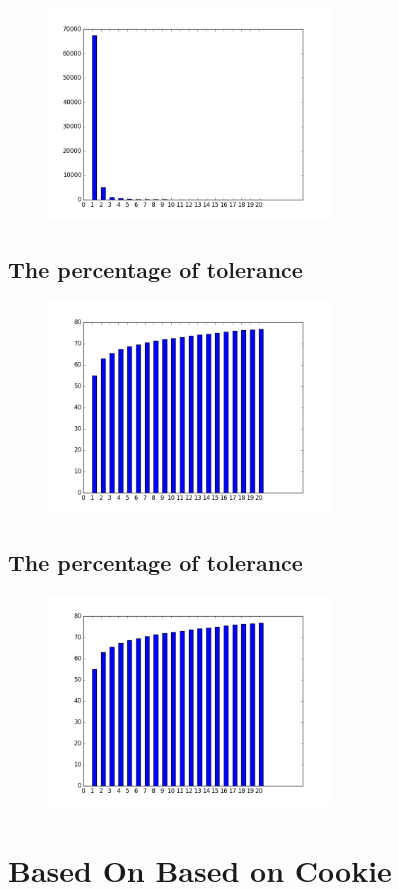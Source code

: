 \documentclass[10pt, conference, compsocconf]{IEEEtran}
\begin{document}
\begin{figure}[H]\centering\includegraphics[width=75mm,scale=0.5]{BasedonClientIDnumberofusersfingerprint}\end{figure}\subsection{The percentage of tolerance}
\begin{figure}[H]\centering\includegraphics[width=75mm,scale=0.5]{BasedonClientIDtolerance}\end{figure}\subsection{The percentage of tolerance}
\begin{figure}[H]\centering\includegraphics[width=75mm,scale=0.5]{BasedonClientIDtolerance}\end{figure}\section{Based On Based on Cookie}
\end{document}

